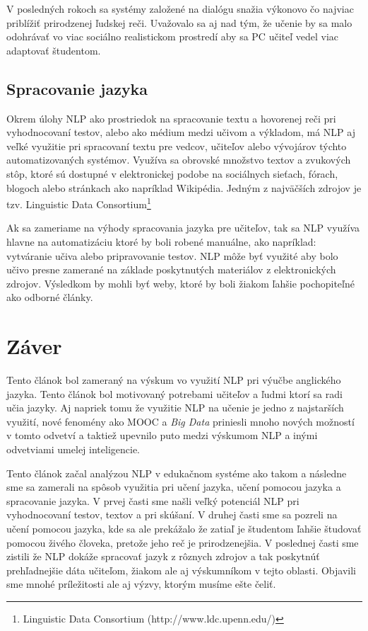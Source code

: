 \documentclass[10pt,slovak,a4paper,twoside]{article}
\begin{document}
	V posledných rokoch sa systémy založené na dialógu snažia výkonovo čo najviac
	priblížiť prirodzenej ľudskej reči. Uvažovalo sa aj nad tým, že učenie by sa malo odohrávať vo viac sociálno realistickom prostredí aby sa PC učiteľ vedel viac adaptovať študentom.
\subsection{Spracovanie jazyka} \label{spracovanie_jazyka}
	Okrem úlohy NLP ako prostriedok na spracovanie textu a hovorenej reči pri vyhodnocovaní testov, 
	alebo ako médium medzi učivom a výkladom, má NLP aj veľké využitie pri spracovaní textu pre vedcov, 
	učiteľov alebo vývojárov týchto automatizovaných systémov. Využíva sa obrovské množstvo textov a zvukových
	stôp, ktoré sú dostupné v elektronickej podobe na sociálnych sieťach, fórach, blogoch alebo stránkach ako 
	napríklad Wikipédia. Jedným z najväčších zdrojov je tzv. Linguistic Data Consortium\footnote{Linguistic Data Consortium (http://www.ldc.upenn.edu/)}
	
	Ak sa zameriame na výhody spracovania jazyka pre učiteľov, tak sa NLP využíva hlavne na automatizáciu ktoré by boli robené manuálne, 
	ako napríklad: vytváranie učiva alebo pripravovanie testov. NLP môže byť využité aby bolo učivo presne zamerané na základe 
	poskytnutých materiálov z elektronických zdrojov. Výsledkom by mohli byť weby, ktoré by boli žiakom ľahšie pochopiteľné ako odborné články\cite{miltsakaki2009matching}.

\section{Záver} \label{zaver} %
	Tento článok bol zameraný na výskum vo využití NLP pri výučbe anglického jazyka. Tento článok bol motivovaný 
	potrebami učiteľov a ľudmi ktorí sa radi učia jazyky. Aj napriek tomu že využitie NLP na učenie je jedno z najstarších využití, 
	nové fenomény ako MOOC a \textit{Big Data} priniesli mnoho nových možností v tomto odvetví a taktiež upevnilo puto medzi výskumom NLP a inými 
	odvetviami umelej inteligencie.

	Tento článok začal analýzou NLP v edukačnom systéme ako takom a následne sme sa zamerali na spôsob využitia pri učení jazyka, 
	učení pomocou jazyka a spracovanie jazyka. V prvej časti sme našli veľký potenciál NLP pri vyhodnocovaní testov, textov a pri skúšaní.
	V druhej časti sme sa pozreli na učení pomocou jazyka, kde sa ale prekážalo že zatiaľ je študentom ľahšie študovať pomocou živého človeka, 
	pretože jeho reč je prirodzenejšia. V poslednej časti sme zistili že NLP dokáže spracovať jazyk z rôznych zdrojov a tak poskytnúť prehľadnejšie dáta
	učiteľom, žiakom ale aj výskumníkom v tejto oblasti. Objavili sme mnohé príležitosti ale aj výzvy, ktorým musíme ešte čeliť.


 
\end{document}
